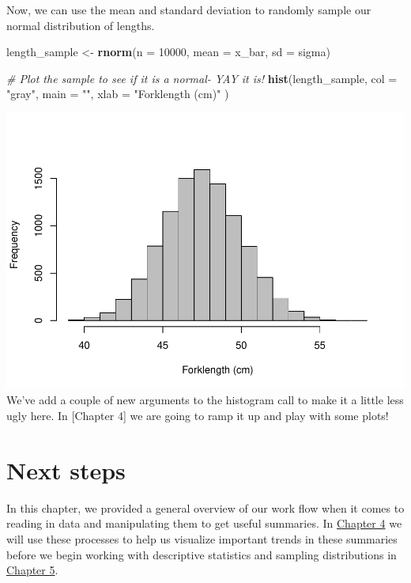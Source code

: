 \documentclass[
]{book}
\newenvironment{Shaded}{\begin{snugshade}}{\end{snugshade}}
\newcommand{\CommentTok}[1]{\textcolor[rgb]{0.56,0.35,0.01}{\textit{#1}}}
\newcommand{\DataTypeTok}[1]{\textcolor[rgb]{0.13,0.29,0.53}{#1}}
\newcommand{\DecValTok}[1]{\textcolor[rgb]{0.00,0.00,0.81}{#1}}
\newcommand{\KeywordTok}[1]{\textcolor[rgb]{0.13,0.29,0.53}{\textbf{#1}}}
\newcommand{\NormalTok}[1]{#1}
\newcommand{\StringTok}[1]{\textcolor[rgb]{0.31,0.60,0.02}{#1}}
\begin{document}
Now, we can use the mean and standard deviation to randomly sample our normal distribution of lengths.

\begin{Shaded}
\begin{Highlighting}[]
\NormalTok{length_sample <-}\StringTok{ }\KeywordTok{rnorm}\NormalTok{(}\DataTypeTok{n =} \DecValTok{10000}\NormalTok{, }\DataTypeTok{mean =}\NormalTok{ x_bar, }\DataTypeTok{sd =}\NormalTok{ sigma)}

\CommentTok{# Plot the sample to see if it is a normal- YAY it is!}
\KeywordTok{hist}\NormalTok{(length_sample,}
  \DataTypeTok{col =} \StringTok{"gray"}\NormalTok{,}
  \DataTypeTok{main =} \StringTok{""}\NormalTok{,}
  \DataTypeTok{xlab =} \StringTok{"Forklength (cm)"}
\NormalTok{)}
\end{Highlighting}
\end{Shaded}

\includegraphics{worstr_files/figure-latex/unnamed-chunk-82-1.pdf}
We've add a couple of new arguments to the histogram call to make it a little less ugly here. In {[}Chapter 4{]} we are going to ramp it up and play with some plots!

\hypertarget{next-steps}{%
\section{Next steps}\label{next-steps}}

In this chapter, we provided a general overview of our work flow when it comes to reading in data and manipulating them to get useful summaries. In \protect\hyperlink{Chapter4}{Chapter 4} we will use these processes to help us visualize important trends in these summaries before we begin working with descriptive statistics and sampling distributions in \protect\hyperlink{Chapter5}{Chapter 5}.
\end{document}
